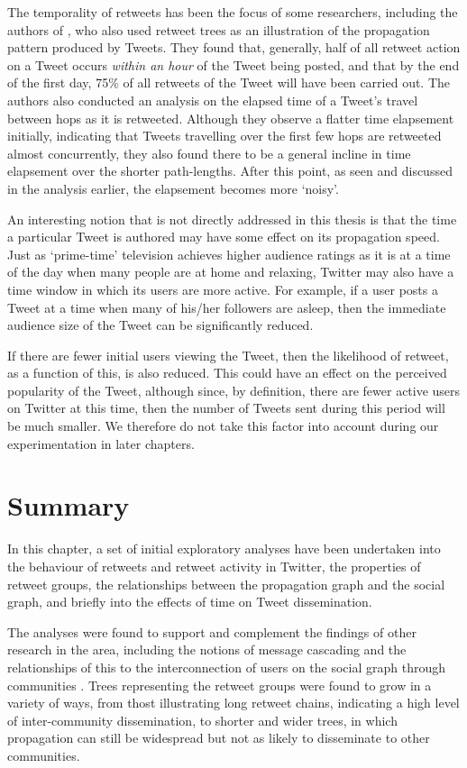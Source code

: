 The temporality of retweets has been the focus of some researchers, including the authors of \cite{kwak10}, who also used retweet trees as an illustration of the propagation pattern produced by Tweets. They found that, generally, half of all retweet action on a Tweet occurs \textit{within an hour} of the Tweet being posted, and that by the end of the first day, 75\% of all retweets of the Tweet will have been carried out. The authors also conducted an analysis on the elapsed time of a Tweet's travel between hops as it is retweeted. Although they observe a flatter time elapsement initially, indicating that Tweets travelling over the first few hops are retweeted almost concurrently, they also found there to be a general incline in time elapsement over the shorter path-lengths. After this point, as seen and discussed in the analysis earlier, the elapsement becomes more `noisy'. 

An interesting notion that is not directly addressed in this thesis is that the time a particular Tweet is authored may have some effect on its propagation speed. Just as `prime-time' television achieves higher audience ratings as it is at a time of the day when many people are at home and relaxing, Twitter may also have a time window in which its users are more active. For example, if a user posts a Tweet at a time when many of his/her followers are asleep, then the immediate audience size of the Tweet can be significantly reduced.

If there are fewer initial users viewing the Tweet, then the likelihood of retweet, as a function of this, is also reduced. This could have an effect on the perceived popularity of the Tweet, although since, by definition, there are fewer active users on Twitter at this time, then the number of Tweets sent during this period will be much smaller. We therefore do not take this factor into account during our experimentation in later chapters.


\section{Summary}
In this chapter, a set of initial exploratory analyses have been undertaken into the behaviour of retweets and retweet activity in Twitter, the properties of retweet groups, the relationships between the propagation graph and the social graph, and briefly into the effects of time on Tweet dissemination.

The analyses were found to support and complement the findings of other research in the area, including the notions of message cascading \cite{galuba10} and the relationships of this to the interconnection of users on the social graph through communities \cite{java07}. Trees representing the retweet groups were found to grow in a variety of ways, from thost illustrating long retweet chains, indicating a high level of inter-community dissemination, to shorter and wider trees, in which propagation can still be widespread but not as likely to disseminate to other communities.

